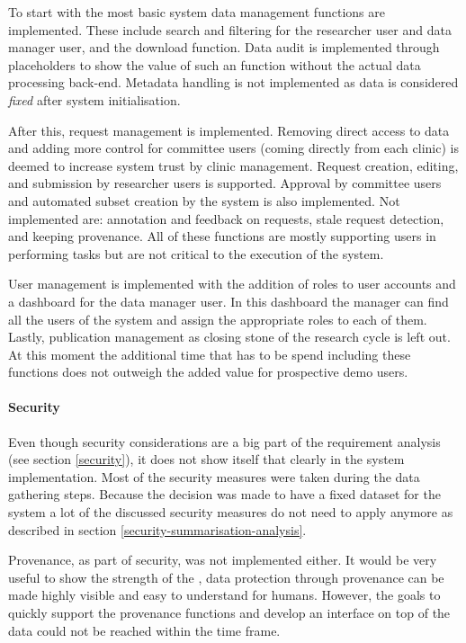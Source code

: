 To start with the most basic system data management functions are implemented.
These include search and filtering for the researcher user and data manager user, and the download function.
Data audit is implemented through placeholders to show the value of such an function without the actual data processing back-end.
Metadata handling is not implemented as data is considered \emph{fixed} after system initialisation.

After this, request management is implemented.
Removing direct access to data and adding more control for committee users (coming directly from each clinic) is deemed to increase system trust by clinic management.
Request creation, editing, and submission by researcher users is supported.
Approval by committee users and automated subset creation by the system is also implemented.
Not implemented are: annotation and feedback on requests, stale request detection, and keeping provenance.
All of these functions are mostly supporting users in performing tasks but are not critical to the execution of the system.

User management is implemented with the addition of roles to user accounts and a dashboard for the data manager user.
In this dashboard the manager can find all the users of the system and assign the appropriate roles to each of them.
Lastly, publication management as closing stone of the research cycle is left out.
At this moment the additional time that has to be spend including these functions does not outweigh the added value for prospective demo users.

\paragraph{Security}
Even though security considerations are a big part of the requirement analysis (see section \ref{security}), it does not show itself that clearly in the system implementation.
Most of the security measures were taken during the data gathering steps.
Because the decision was made to have a fixed dataset for the system a lot of the discussed security measures do not need to apply anymore as described in section \ref{security-summarisation-analysis}.

Provenance, as part of security, was not implemented either.
It would be very useful to show the strength of the \ivfsystem{}, data protection through provenance can be made highly visible and easy to understand for humans.
However, the goals to quickly support the provenance functions and develop an interface on top of the data could not be reached within the time frame.

